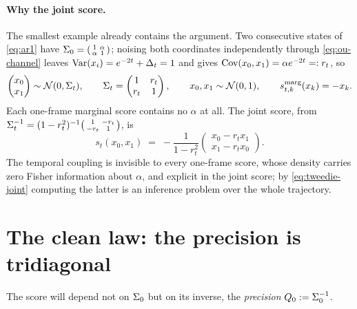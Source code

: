 \paragraph{Why the joint score.}
The smallest example already contains the argument. Two consecutive states of
\eqref{eq:ar1} have $\Sigma_0 = \begin{psmallmatrix}1&\alpha\\\alpha&1\end{psmallmatrix}$;
noising both coordinates independently through \eqref{eq:ou-channel} leaves
$\operatorname{Var}(x_i) = e^{-2t} + \Delta_t = 1$ and gives
$\operatorname{Cov}(x_0,x_1) = \alpha e^{-2t} =: r_t$, so
\begin{equation}
  \begin{pmatrix}x_0\\x_1\end{pmatrix} \sim \mathcal{N}(0, \Sigma_t),
  \qquad
  \Sigma_t = \begin{pmatrix}1 & r_t\\ r_t & 1\end{pmatrix},
  \qquad
  x_0, x_1 \sim \mathcal{N}(0,1),
  \qquad
  s^{\mathrm{marg}}_{t,k}(x_k) = -x_k .
  \label{eq:dev-L2-marginal}
\end{equation}
Each one-frame marginal score contains no $\alpha$ at all. The joint score,
from $\Sigma_t^{-1} = (1-r_t^2)^{-1}\begin{psmallmatrix}1&-r_t\\-r_t&1\end{psmallmatrix}$,
is
\begin{equation}
  \boxed{\;
  s_t(x_0,x_1)
  \;=\;
  -\frac{1}{1-r_t^2}
  \begin{pmatrix} x_0 - r_t x_1\\ x_1 - r_t x_0 \end{pmatrix}.
  \;}
  \label{eq:dev-L2-score}
\end{equation}
The temporal coupling is invisible to every one-frame score, whose density
carries zero Fisher information about $\alpha$, and explicit in the joint
score; by \eqref{eq:tweedie-joint} computing the latter is an inference
problem over the whole trajectory.

\section{The clean law: the precision is tridiagonal}
\label{sec:g-clean}\label{sec:g-precision}

The score will depend not on $\Sigma_0$ but on its inverse, the \emph{precision}
$Q_0 := \Sigma_0^{-1}$.

